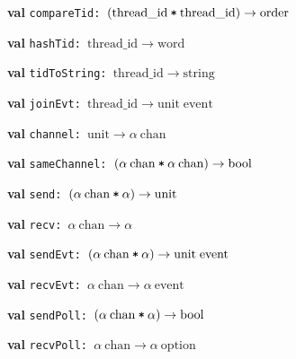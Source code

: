 \begin{interface}
\item {}{\textbf{val}} {\tt compareTid: \((\mathrm{thread\_id}\:\verb,*,\:\mathrm{thread\_id})\rightarrow \mathrm{order}\)}

\item {}{\textbf{val}} {\tt hashTid: \(\mathrm{thread\_id}\rightarrow \mathrm{word}\)}

\item {}{\textbf{val}} {\tt tidToString: \(\mathrm{thread\_id}\rightarrow \mathrm{string}\)}

\item {}{\textbf{val}} {\tt joinEvt: \(\mathrm{thread\_id}\rightarrow \mathrm{unit}\;\mathrm{event}\)}

\item {}{\textbf{val}} {\tt channel: \(\mathrm{unit}\rightarrow \alpha\:\mathrm{chan}\)}

\item {}{\textbf{val}} {\tt sameChannel: \((\alpha\:\mathrm{chan}\:\verb,*,\:\alpha\:\mathrm{chan})\rightarrow \mathrm{bool}\)}

\item {}{\textbf{val}} {\tt send: \((\alpha\:\mathrm{chan}\:\verb,*,\:\alpha)\rightarrow \mathrm{unit}\)}

\item {}{\textbf{val}} {\tt recv: \(\alpha\:\mathrm{chan}\rightarrow \alpha\)}

\item {}{\textbf{val}} {\tt sendEvt: \((\alpha\:\mathrm{chan}\:\verb,*,\:\alpha)\rightarrow \mathrm{unit}\;\mathrm{event}\)}

\item {}{\textbf{val}} {\tt recvEvt: \(\alpha\:\mathrm{chan}\rightarrow \alpha\:\mathrm{event}\)}

\item {}{\textbf{val}} {\tt sendPoll: \((\alpha\:\mathrm{chan}\:\verb,*,\:\alpha)\rightarrow \mathrm{bool}\)}

\item {}{\textbf{val}} {\tt recvPoll: \(\alpha\:\mathrm{chan}\rightarrow \alpha\:\mathrm{option}\)}


\end{interface}
